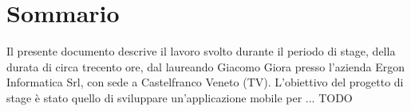 \cleardoublepage
{}
{}
\begingroup
\let\clearpage\relax
\let\cleardoublepage\relax
\chapter*{Sommario}

Il presente documento descrive il lavoro svolto durante il periodo di stage, della durata di circa trecento ore, dal laureando Giacomo Giora presso l'azienda Ergon Informatica Srl, con sede a Castelfranco Veneto (TV).
L'obiettivo del progetto di stage è stato quello di sviluppare un'applicazione mobile per ...  TODO

\endgroup
\vfill
